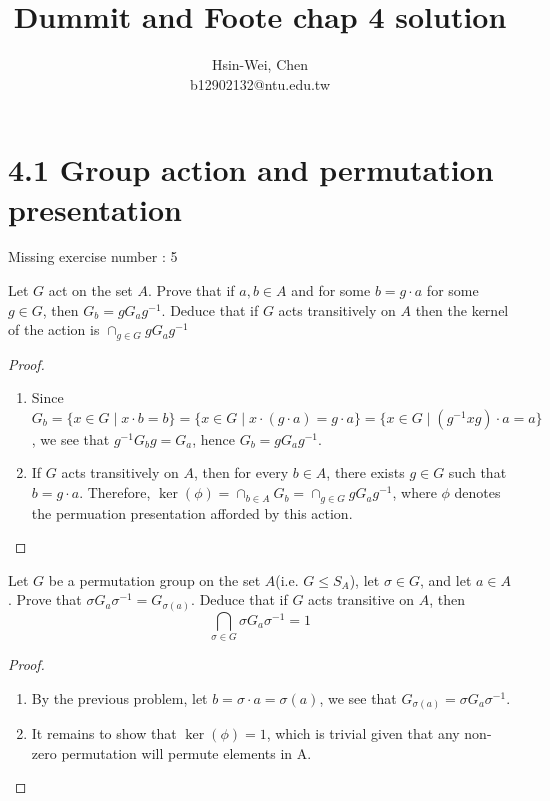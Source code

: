 \documentclass{article}
\newenvironment{problem}[2][Problem]{\begin{trivlist}
\item[\hskip \labelsep {\bfseries #1}\hskip \labelsep {\bfseries #2.}]}{\end{trivlist}}
\begin{document}

\title{Dummit and Foote chap 4 solution} %
\author{Hsin-Wei, Chen\\b12902132@ntu.edu.tw\\} %

\maketitle
\section*{4.1 Group action and permutation presentation}
Missing exercise number : 5
\begin{problem}{1}\hspace{0.1cm}
    Let $G$ act on the set $A$. Prove that if $a, b \in A$ and for some $b = g \cdot a$ for some $g\in G$, then $G_b = g G_a g^{-1}$. Deduce that if $G$ acts transitively on $A$ then the kernel of the action is $\cap_{g \in G}gG_ag^{-1}$
\end{problem}
\begin{proof}\hspace{0.1cm}
    \begin{enumerate}
        \item 

    Since $G_b = \{x \in G \mid x \cdot b = b \} = \{ x \in G \mid x \cdot (g \cdot a) = g \cdot a \}=\{x \in G \mid (g^{-1}xg)\cdot a = a\}$, we see that $ g^{-1}G_bg =G_a $, hence $G_b = gG_ag^{-1}$.
    \item If $G$ acts transitively on $A$, then for every $b \in A$, there exists $g \in G$ such that $b =g \cdot a $. Therefore, $\ker(\phi) = \cap_{b \in A}G_b=\cap_{g \in G}g G_a g^{-1}$, where $\phi$ denotes the permuation presentation afforded by this action.
        \end{enumerate}
\end{proof}
\begin{problem}{2}
    Let $G$ be a permutation group on the set $A$(i.e. $G \leq S_A$), let $\sigma \in G$, and let $a \in A$. Prove that $\sigma G_a \sigma^{-1}=G_{\sigma(a)}$. Deduce that if $G$ acts transitive on $A$, then 
    \[
    \bigcap_{\sigma \in G}\sigma G_a\sigma^{-1}=1
    \]
\end{problem}
\begin{proof}\hspace{0.1cm}
    \begin{enumerate}
        \item By the previous problem, let $b = \sigma \cdot a =\sigma(a)$, we see that $G_{\sigma(a)} = \sigma G_a \sigma^{-1}$.
        \item It remains to show that $\ker(\phi)=1$, which is trivial given that any non-zero permutation will permute elements in A.
    \end{enumerate}
\end{proof}
\end{document}
